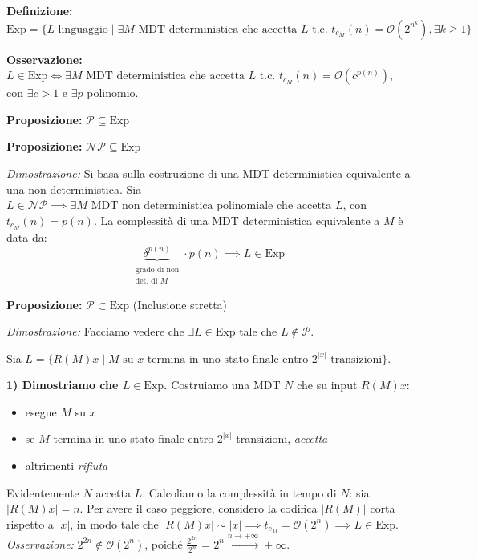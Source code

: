 \textbf{Definizione:} 
$$ \text{Exp} = \{ L \text{ linguaggio} \mid \exists M \text{ MDT deterministica che accetta } L \text{ t.c. } t_{c_M}(n) = \mathcal{O}(2^{n^k}), \exists k \ge 1 \} $$

\textbf{Osservazione:} $L \in \text{Exp} \iff \exists M \text{ MDT deterministica che accetta } L \text{ t.c. } t_{c_M}(n) = \mathcal{O}(c^{p(n)})$, con $\exists c > 1$ e $\exists p$ polinomio.

\vspace{0.4cm}
\textbf{Proposizione:} $\mathcal{P} \subseteq \text{Exp}$

\vspace{0.4cm}
\textbf{Proposizione:} $\mathcal{NP} \subseteq \text{Exp}$

\textit{Dimostrazione:} Si basa sulla costruzione di una MDT deterministica equivalente a una non deterministica.
Sia $L \in \mathcal{NP} \implies \exists M \text{ MDT non deterministica polinomiale che accetta } L$, con $t_{c_M}(n) = p(n)$.
La complessità di una MDT deterministica equivalente a $M$ è data da:
$$ \underbrace{\delta^{p(n)}}_{\substack{\text{grado di non} \\ \text{det. di } M}} \cdot p(n) \implies L \in \text{Exp} $$

\begin{center}
\end{center}

\vspace{0.4cm}
\textbf{Proposizione:} $\mathcal{P} \subset \text{Exp}$ (Inclusione stretta)

\textit{Dimostrazione:} Facciamo vedere che $\exists L \in \text{Exp}$ tale che $L \notin \mathcal{P}$. 

Sia $L = \{ R(M)x \mid M \text{ su } x \text{ termina in uno stato finale entro } 2^{|x|} \text{ transizioni} \}$.

\textbf{1) Dimostriamo che $L \in \text{Exp}$.} 
Costruiamo una MDT $N$ che su input $R(M)x$:
\begin{itemize}
    \item esegue $M$ su $x$
    \item se $M$ termina in uno stato finale entro $2^{|x|}$ transizioni, \textit{accetta}
    \item altrimenti \textit{rifiuta}
\end{itemize}
Evidentemente $N$ accetta $L$.
Calcoliamo la complessità in tempo di $N$: sia $|R(M)x| = n$. Per avere il caso peggiore, considero la codifica $|R(M)|$ corta rispetto a $|x|$, in modo tale che $|R(M)x| \sim |x| \implies t_{c_M} = \mathcal{O}(2^n) \implies L \in \text{Exp}$.
\textit{Osservazione:} $2^{2n} \notin \mathcal{O}(2^n)$, poiché $\frac{2^{2n}}{2^n} = 2^n \xrightarrow{n \to +\infty} +\infty$.

